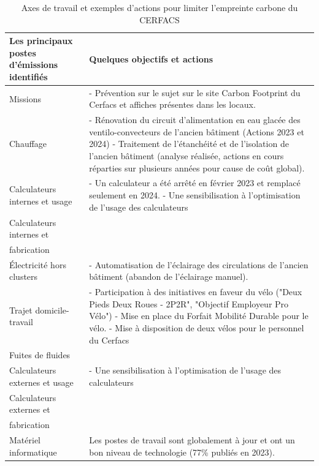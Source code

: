 \begin{table}[H]
    \centering
    \begin{tabular}{|p{}|p{}|}
    \hline
    \textbf{Les principaux postes d’émissions identifiés} & \textbf{Quelques objectifs et actions} \\
    \hline
    Missions & 
    - Prévention sur le sujet sur le site Carbon Footprint du Cerfacs et affiches présentes dans les locaux. \\
    \hline
    Chauffage & 
    - Rénovation du circuit d’alimentation en eau glacée des ventilo-convecteurs de l’ancien bâtiment (Actions 2023 et 2024) \newline
    - Traitement de l’étanchéité et de l’isolation de l’ancien bâtiment (analyse réalisée, actions en cours réparties sur plusieurs années pour cause de coût global). \\
    \hline
    Calculateurs internes et usage & 
    - Un calculateur a été arrêté en février 2023 et remplacé seulement en 2024. \newline
    - Une sensibilisation à l’optimisation de l’usage des calculateurs \\
    \hline
    Calculateurs internes et \\fabrication & 
    \phantom{-}
    \phantom{-}\\
    \hline
    Électricité hors clusters & 
    - Automatisation de l’éclairage des circulations de l’ancien bâtiment (abandon de l’éclairage manuel). \\
    \hline
    Trajet domicile-travail & 
    - Participation à des initiatives en faveur du vélo ("Deux Pieds Deux Roues - 2P2R", "Objectif Employeur Pro Vélo") \newline
    - Mise en place du Forfait Mobilité Durable pour le vélo. \newline
    - Mise à disposition de deux vélos pour le personnel du Cerfacs \\
    \hline
    Fuites de fluides &  \\
    \hline
    Calculateurs externes et usage & 
    - Une sensibilisation à l’optimisation de l’usage des calculateurs \\
    \hline
    Calculateurs externes et \\fabrication &
    \phantom{-}
    \phantom{-}\\
    \hline
    Matériel informatique & 
    Les postes de travail sont globalement à jour et ont un bon niveau de technologie (77\% publiés en 2023). \\
    \hline
    \end{tabular}
    \caption{Axes de travail et exemples d'actions pour limiter l'empreinte carbone du \\ CERFACS}
    \label{tab:Eco_actions}
\end{table}


